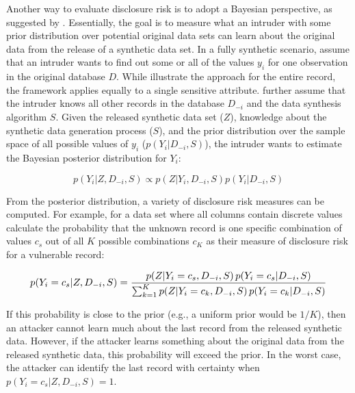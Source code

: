 \documentclass[Afour,sageh,times,doublespace]{sagej}
\begin{document}
Another way to evaluate disclosure risk is to adopt a Bayesian perspective, as suggested by \citet{reiter2014}. Essentially, the goal is to measure what an intruder with some prior distribution over potential original data sets can learn about the original data from the release of a synthetic data set. In a fully synthetic scenario, \citet{reiter2014} assume that an intruder wants to find out some or all of the values $y_i$ for one observation in the original database $D$. While \citet{reiter2014} illustrate the approach for the entire record, the framework applies equally to a single sensitive attribute. \citet{reiter2014} further assume that the intruder knows all other records in the database $D_{-i}$ and the data synthesis algorithm $S$. Given the released synthetic data set ($Z$), knowledge about the synthetic data generation process ($S$), and the prior distribution over the sample space of all possible values of $y_i$ ($p(Y_i|D_{-i}, S)$), the intruder wants to estimate the Bayesian posterior distribution for $Y_i$:

\begin{equation}
p(Y_i | Z, D_{-i}, S) \propto p(Z | Y_i, D_{-i}, S) p(Y_i | D_{-i}, S)
\end{equation}

From the posterior distribution, a variety of disclosure risk measures can be computed. For example, for a data set where all columns contain discrete values \citet{reiter2014} calculate the probability that the unknown record is one specific combination of values $c_s$ out of all $K$ possible combinations $c_K$ as their measure of disclosure risk for a vulnerable record:

\begin{equation}
\resizebox{0.9\columnwidth}{!}{$\displaystyle
p(Y_i = c_s | Z, D_{-i}, S) = \frac{p(Z | Y_i = c_s, D_{-i}, S) \, p(Y_i = c_s | D_{-i}, S)}{\sum_{k=1}^{K} p(Z | Y_i = c_k, D_{-i}, S) \, p(Y_i = c_k | D_{-i}, S)}
$}
\label{eq:bayesian}
\end{equation}

If this probability is close to the prior (e.g., a uniform prior would be $1/K$), then an attacker cannot learn much about the last record from the released synthetic data. However, if the attacker learns something about the original data from the released synthetic data, this probability will exceed the prior. In the worst case, the attacker can identify the last record with certainty when $p(Y_i = c_s | Z, D_{-i}, S) = 1$.
\end{document}

